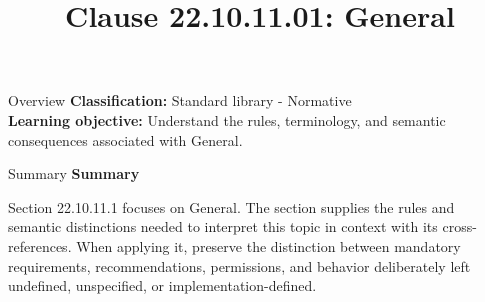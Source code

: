 \documentclass[10pt,letterpaper]{article}
\title{Clause 22.10.11.01: General}
\author{}
\date{}
\begin{document}
\maketitle
\begin{CornellOverviewBox}{Overview}
\textbf{Classification:} Standard library - Normative\\[2pt]
\textbf{Learning objective:} Understand the rules, terminology, and semantic consequences associated with General.
\end{CornellOverviewBox}\begin{CornellSummaryBox}{Summary}
{\sffamily\bfseries\color{Accent} Summary}\par\vspace{3pt}Section 22.10.11.1 focuses on General. The section supplies the rules and semantic distinctions needed to interpret this topic in context with its cross-references. When applying it, preserve the distinction between mandatory requirements, recommendations, permissions, and behavior deliberately left undefined, unspecified, or implementation-defined.
\end{CornellSummaryBox}
\end{document}
